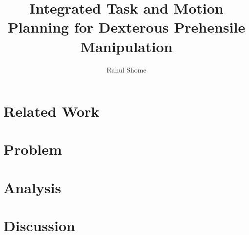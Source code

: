 \documentclass[letterpaper]{article} %
\begin{document}
\title{Integrated Task and Motion Planning for Dexterous Prehensile Manipulation}
\author{Rahul Shome}
\maketitle





\section{Related Work}


\section{Problem}


\section{Analysis}


\section{Discussion}


 


\end{document}
